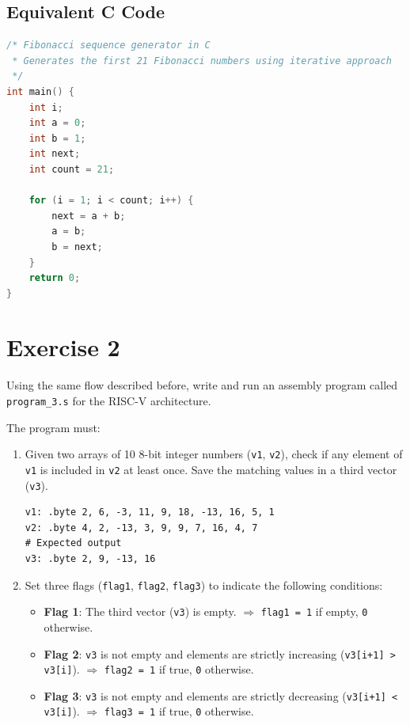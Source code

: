 \documentclass[a4paper,12pt]{article}
\begin{document}
\subsection*{Equivalent C Code}

\begin{lstlisting}[language=C, caption={Fibonacci sequence generator in C}]
/* Fibonacci sequence generator in C
 * Generates the first 21 Fibonacci numbers using iterative approach
 */
int main() {
    int i;
    int a = 0;
    int b = 1;
    int next;
    int count = 21;

    for (i = 1; i < count; i++) {
        next = a + b;
        a = b;
        b = next;
    }
    return 0;
}
\end{lstlisting}

\newpage
\section*{Exercise 2}

Using the same flow described before, write and run an assembly program called \texttt{program\_3.s} for the RISC-V architecture.

The program must:

\begin{enumerate}
    \item Given two arrays of 10 8-bit integer numbers (\texttt{v1}, \texttt{v2}), check if any element of \texttt{v1} is included in \texttt{v2} at least once. Save the matching values in a third vector (\texttt{v3}).

    \begin{lstlisting}[language={[x86masm]Assembler}]
v1: .byte 2, 6, -3, 11, 9, 18, -13, 16, 5, 1
v2: .byte 4, 2, -13, 3, 9, 9, 7, 16, 4, 7
# Expected output
v3: .byte 2, 9, -13, 16
    \end{lstlisting}

    \item Set three flags (\texttt{flag1}, \texttt{flag2}, \texttt{flag3}) to indicate the following conditions:
    \begin{itemize}
        \item \textbf{Flag 1}: The third vector (\texttt{v3}) is empty.  
        $\Rightarrow$ \texttt{flag1 = 1} if empty, \texttt{0} otherwise.
        \item \textbf{Flag 2}: \texttt{v3} is not empty and elements are strictly increasing (\texttt{v3[i+1] > v3[i]}).  
        $\Rightarrow$ \texttt{flag2 = 1} if true, \texttt{0} otherwise.
        \item \textbf{Flag 3}: \texttt{v3} is not empty and elements are strictly decreasing (\texttt{v3[i+1] < v3[i]}).  
        $\Rightarrow$ \texttt{flag3 = 1} if true, \texttt{0} otherwise.
    \end{itemize}
\end{enumerate}
\end{document}
